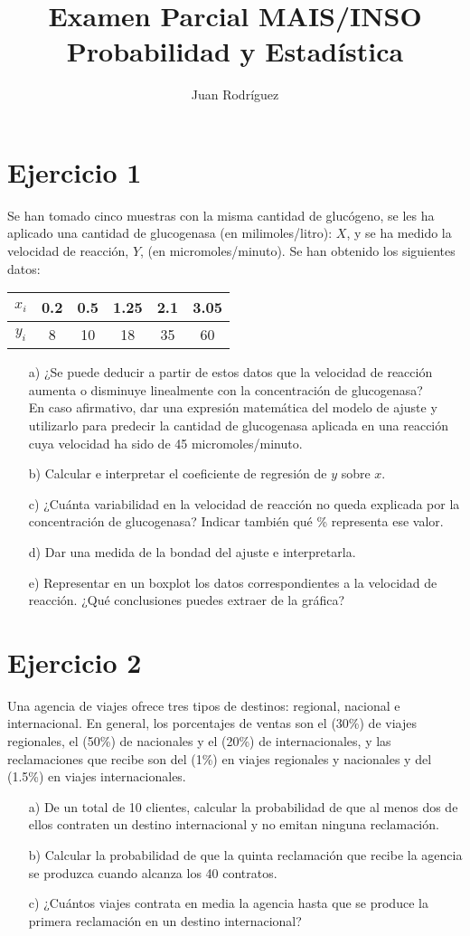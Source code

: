 \documentclass[fleqn]{article}
\title{Examen Parcial MAIS/INSO Probabilidad y Estadística}
\author{Juan Rodríguez}
\begin{document}
	\maketitle
	\section{Ejercicio 1}
	Se han tomado cinco muestras con la misma cantidad de glucógeno, se les ha aplicado una cantidad de glucogenasa (en milimoles/litro): \(X\), y se ha medido la velocidad de reacción, \(Y\), (en micromoles/minuto). Se han obtenido los siguientes datos:
	\begin{table}[h!]
		\centering
		\begin{tabular}{|c|c|c|c|c|c|}
			\hline
			\( x_i \) & 0.2 & 0.5 & 1.25 & 2.1 & 3.05 \\ \hline
			\( y_i \) & 8 & 10 & 18 & 35 & 60 \\ \hline
		\end{tabular}
	\end{table}
	\begin{itemize}
		\item[a)] ¿Se puede deducir a partir de estos datos que la velocidad de reacción aumenta o disminuye linealmente con la concentración de glucogenasa?\\
		En caso afirmativo, dar una expresión matemática del modelo de ajuste y utilizarlo para predecir la cantidad de glucogenasa aplicada en una reacción cuya velocidad ha sido de 45 micromoles/minuto.
		\item[b)] Calcular e interpretar el coeficiente de regresión de \(y\) sobre \(x\).
		\item[c)] ¿Cuánta variabilidad en la velocidad de reacción no queda explicada por la concentración de glucogenasa? Indicar también qué \% representa ese valor.
		\item[d)] Dar una medida de la bondad del ajuste e interpretarla.
		\item[e)] Representar en un boxplot los datos correspondientes a la velocidad de reacción. ¿Qué conclusiones puedes extraer de la gráfica?
	\end{itemize}
	\section{Ejercicio 2}
	Una agencia de viajes ofrece tres tipos de destinos: regional, nacional e internacional. En general, los porcentajes de ventas son el (30\%) de viajes regionales, el (50\%) de nacionales y el (20\%) de internacionales, y las reclamaciones que recibe son del (1\%) en viajes regionales y nacionales y del (1.5\%) en viajes internacionales.
	\begin{itemize}
		\item[a)] De un total de 10 clientes, calcular la probabilidad de que al menos dos de ellos contraten un destino internacional y no emitan ninguna reclamación.
		\item[b)] Calcular la probabilidad de que la quinta reclamación que recibe la agencia se produzca cuando alcanza los 40 contratos.
		\item[c)] ¿Cuántos viajes contrata en media la agencia hasta que se produce la primera reclamación en un destino internacional?
	\end{itemize}
\end{document}
